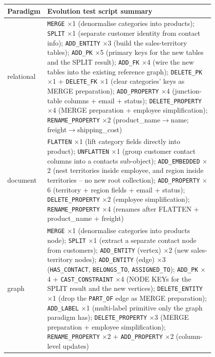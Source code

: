   \begin{figure}[t!]
  \centering
  \footnotesize
  \begin{tabularx}{\textwidth}{@{}p{3.5cm} X@{}}
  \toprule
  \textbf{Paradigm} & \textbf{Evolution test script summary} \\
  \midrule

  relational
   & \texttt{MERGE} $\times$1 (denormalise categories into products);
     \texttt{SPLIT} $\times$1 (separate customer identity from contact info);
     \texttt{ADD\_ENTITY} $\times$3 (build the sales-territory tables);
     \texttt{ADD\_PK} $\times$5 (primary keys for the new tables and the SPLIT result);
     \texttt{ADD\_FK} $\times$4 (wire the new tables into the existing reference graph);
     \texttt{DELETE\_PK} $\times$1 + \texttt{DELETE\_FK} $\times$1 (clear categories' keys as MERGE preparation);
     \texttt{ADD\_PROPERTY} $\times$4 (junction-table columns + email + status);
     \texttt{DELETE\_PROPERTY} $\times$4 (MERGE preparation + employee simplification);
     \texttt{RENAME\_PROPERTY} $\times$2 (product\_name$\to$name; freight$\to$shipping\_cost) \\
  \midrule

  document
   & \texttt{FLATTEN} $\times$1 (lift category fields directly into product);
     \texttt{UNFLATTEN} $\times$1 (group customer contact columns into a contacts sub-object);
     \texttt{ADD\_EMBEDDED} $\times$2 (nest territories inside employee, and region inside territories -- no new root collection);
     \texttt{ADD\_PROPERTY} $\times$6 (territory + region fields + email + status);
     \texttt{DELETE\_PROPERTY} $\times$2 (employee simplification);
     \texttt{RENAME\_PROPERTY} $\times$4 (renames after FLATTEN + product\_name + freight) \\
  \midrule

  graph
   & \texttt{MERGE} $\times$1 (denormalise categories into products node);
     \texttt{SPLIT} $\times$1 (extract a separate contact node from customers);
     \texttt{ADD\_ENTITY} (vertex) $\times$2 (new sales-territory nodes);
     \texttt{ADD\_ENTITY} (edge) $\times$3 (\texttt{HAS\_CONTACT}, \texttt{BELONGS\_TO}, \texttt{ASSIGNED\_TO});
     \texttt{ADD\_PK} $\times$4 + \texttt{CAST\_CONSTRAINT} $\times$4 (NODE KEYs for the SPLIT result and the new vertices);
     \texttt{DELETE\_ENTITY} $\times$1 (drop the \texttt{PART\_OF} edge as MERGE preparation);
     \texttt{ADD\_LABEL} $\times$1 (multi-label primitive only the graph paradigm has);
     \texttt{DELETE\_PROPERTY} $\times$3 (MERGE preparation + employee simplification);
     \texttt{RENAME\_PROPERTY} $\times$2 + \texttt{ADD\_PROPERTY} $\times$2 (column-level updates) \\
  \midrule


\end{tabularx}
\end{figure}
